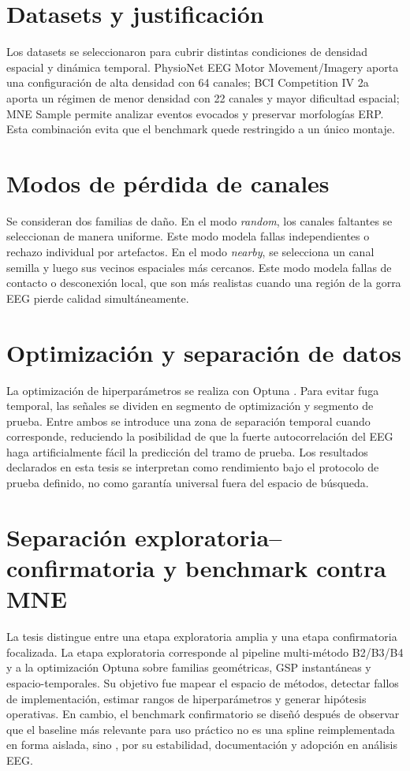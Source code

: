 \section{Datasets y justificación}
Los datasets se seleccionaron para cubrir distintas condiciones de densidad espacial y dinámica temporal. PhysioNet EEG Motor Movement/Imagery aporta una configuración de alta densidad con 64 canales; BCI Competition IV 2a aporta un régimen de menor densidad con 22 canales y mayor dificultad espacial; MNE Sample permite analizar eventos evocados y preservar morfologías ERP. Esta combinación evita que el benchmark quede restringido a un único montaje.

\section{Modos de pérdida de canales}
Se consideran dos familias de daño. En el modo \textit{random}, los canales faltantes se seleccionan de manera uniforme. Este modo modela fallas independientes o rechazo individual por artefactos. En el modo \textit{nearby}, se selecciona un canal semilla y luego sus vecinos espaciales más cercanos. Este modo modela fallas de contacto o desconexión local, que son más realistas cuando una región de la gorra EEG pierde calidad simultáneamente.

\section{Optimización y separación de datos}
La optimización de hiperparámetros se realiza con Optuna \cite{akiba2019optuna}. Para evitar fuga temporal, las señales se dividen en segmento de optimización y segmento de prueba. Entre ambos se introduce una zona de separación temporal cuando corresponde, reduciendo la posibilidad de que la fuerte autocorrelación del EEG haga artificialmente fácil la predicción del tramo de prueba. Los resultados declarados en esta tesis se interpretan como rendimiento bajo el protocolo de prueba definido, no como garantía universal fuera del espacio de búsqueda.

\section{Separación exploratoria--confirmatoria y benchmark contra MNE}

La tesis distingue entre una etapa exploratoria amplia y una etapa confirmatoria focalizada. La etapa exploratoria corresponde al pipeline multi-método B2/B3/B4 y a la optimización Optuna sobre familias geométricas, GSP instantáneas y espacio-temporales. Su objetivo fue mapear el espacio de métodos, detectar fallos de implementación, estimar rangos de hiperparámetros y generar hipótesis operativas. En cambio, el benchmark confirmatorio se diseñó después de observar que el baseline más relevante para uso práctico no es una spline reimplementada en forma aislada, sino , por su estabilidad, documentación y adopción en análisis EEG.

